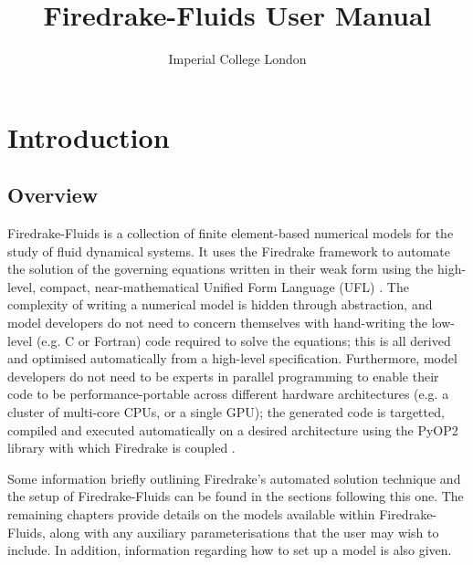 \documentclass[a4paper,11pt]{report}
\title{Firedrake-Fluids User Manual}
\author{Imperial College London}
\begin{document}
\maketitle
\tableofcontents

\setlength{\parskip}{0.3cm}
\setlength{\parindent}{0cm}

\chapter{Introduction}
\section{Overview}
Firedrake-Fluids is a collection of finite element-based numerical models for the study of fluid dynamical systems. It uses the Firedrake framework \citep{ImperialCollegeLondon_2013, Rathgeber_Submitted} to automate the solution of the governing equations written in their weak form using the high-level, compact, near-mathematical Unified Form Language (UFL) \citep{Alnaes_etal_2014}. The complexity of writing a numerical model is hidden through abstraction, and model developers do not need to concern themselves with hand-writing the low-level (e.g. C or Fortran) code required to solve the equations; this is all derived and optimised automatically from a high-level specification. Furthermore, model developers do not need to be experts in parallel programming to enable their code to be performance-portable across different hardware architectures (e.g. a cluster of multi-core CPUs, or a single GPU); the generated code is targetted, compiled and executed automatically on a desired architecture using the PyOP2 library with which Firedrake is coupled \citep{Rathgeber_etal_2012, Markall_etal_2013}.

Some information briefly outlining Firedrake's automated solution technique and the setup of Firedrake-Fluids can be found in the sections following this one. The remaining chapters provide details on the models available within Firedrake-Fluids, along with any auxiliary parameterisations that the user may wish to include. In addition, information regarding how to set up a model is also given.
\end{document}
